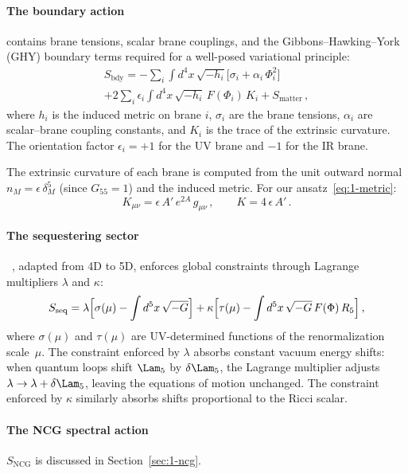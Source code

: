 \paragraph{The boundary action} contains brane tensions, scalar brane couplings, and the Gibbons--Hawking--York (GHY) boundary terms required for a well-posed variational principle:
\begin{multline}
\label{eq:1-bdy-action}
S_{\mathrm{bdy}} = -\sum_i \int d^4x\, \sqrt{-h_i}\bigl[\sigma_i + \alpha_i\, \Phi_i^2\bigr] \\
+ 2\sum_i \epsilon_i \int d^4x\, \sqrt{-h_i}\, F(\Phi_i)\, K_i
+ S_{\mathrm{matter}}\,,
\end{multline}
where $h_i$ is the induced metric on brane $i$, $\sigma_i$ are the brane tensions, $\alpha_i$ are scalar--brane coupling constants, and $K_i$ is the trace of the extrinsic curvature. The orientation factor $\epsilon_i = +1$ for the UV brane and $-1$ for the IR brane.

The extrinsic curvature of each brane is computed from the unit outward normal $n_M = \epsilon\, \delta_M^5$ (since $G_{55} = 1$) and the induced metric. For our ansatz~\eqref{eq:1-metric}:
\begin{equation}
\label{eq:1-extrinsic}
K_{\mu\nu} = \epsilon\, A'\, e^{2A}\, g_{\mu\nu}\,, \qquad K = 4\,\epsilon\, A'\,.
\end{equation}

\paragraph{The sequestering sector}~\cite{ch1:kaloper14}, adapted from 4D to 5D, enforces global constraints through Lagrange multipliers $\lambda$ and $\kappa$:
\begin{equation}
\label{eq:1-seq-action}
S_{\mathrm{seq}} = \lambda\Bigl[\sigma(\mu) - \int d^5x\, \sqrt{-G}\Bigr]
+ \kappa\Bigl[\tau(\mu) - \int d^5x\, \sqrt{-G}\, F(\Phi)\, R_5\Bigr]\,,
\end{equation}
where $\sigma(\mu)$ and $\tau(\mu)$ are UV-determined functions of the renormalization scale~$\mu$. The constraint enforced by $\lambda$ absorbs constant vacuum energy shifts: when quantum loops shift $\Lam_5$ by $\delta\Lam_5$, the Lagrange multiplier adjusts $\lambda \to \lambda + \delta\Lam_5$, leaving the equations of motion unchanged. The constraint enforced by $\kappa$ similarly absorbs shifts proportional to the Ricci scalar.

\paragraph{The NCG spectral action} $S_{\mathrm{NCG}}$ is discussed in Section~\ref{sec:1-ncg}.

